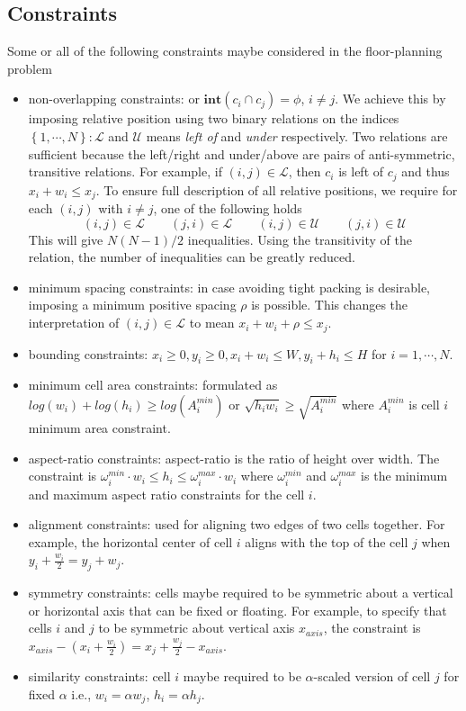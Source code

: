\documentclass[12pt] {article}
\begin{document}
\subsection*{Constraints}
Some or all of the following constraints maybe considered in the floor-planning problem
\begin{itemize}
\item non-overlapping constraints: or $\textbf{int}(c_{i}\cap c_{j})=\phi$, $i \neq j $. We achieve this by imposing relative position using two binary relations on the indices $\left\lbrace 1,\cdots, N \right\rbrace : \mathscr{L}$ and  $\mathscr{U}$ means \emph{left of} and \emph{under} respectively. Two relations are sufficient because the left/right and under/above are pairs of anti-symmetric, transitive relations. For example, if $(i,j)\in \mathscr{L}$, then $c_{i}$ is left of $c_{j}$ and thus $x_{i}+w_{i}\leq x_{j}$. To ensure full description of all relative positions, we require for each $(i,j)$ with $i\neq j$, one of the following holds 
$$(i,j)\in \mathscr{L} \qquad (j,i)\in \mathscr{L} \qquad (i,j)\in \mathscr{U} \qquad (j,i)\in \mathscr{U} $$
This will give $N(N-1)/2$ inequalities. Using the transitivity of the relation, the number of inequalities can be greatly reduced.

\item minimum spacing constraints: in case avoiding tight packing is desirable, imposing a minimum positive spacing $\rho$ is possible. This changes the interpretation of $(i,j)\in \mathscr{L}$ to mean $x_{i}+w_{i}+\rho \leq x_{j}$. 
\item bounding constraints: $x_{i}\geq0, y_{i}\geq0, x_{i}+w_{i}\leq W, y_{i}+h_{i}\leq H$ for $i=1,\cdots, N$. 
\item minimum cell area constraints: formulated as $log(w_{i})+log(h_{i}) \geq log(A_{i}^{min})$ or $\sqrt{h_{i}w_{i}}\geq \sqrt{A_{i}^{min}}$ where $A_{i}^{min}$ is cell $i$ minimum area constraint. 
\item aspect-ratio constraints: aspect-ratio is the ratio of height over width. The constraint is $\omega_{i}^{min}\cdot w_{i}\leq h_{i} \leq \omega_{i}^{max}\cdot w_{i}$ where $\omega_{i}^{min}$ and $\omega_{i}^{max}$ is the minimum and maximum aspect ratio constraints for the cell $i$.
\item alignment constraints: used for aligning two edges of two cells together. For example, the horizontal center of cell $i$ aligns with the top of the cell $j$ when $y_{i}+\frac{w_{i}}{2}=y_{j}+w_{j}$.
\item symmetry constraints: cells maybe required to be symmetric about a vertical or horizontal axis that can be  fixed or floating. For example, to specify that cells $i$ and $j$ to be symmetric about vertical axis $x_{axis}$, the constraint is $x_{axis}-(x_{i}+\frac{w_{i}}{2}) = x_{j}+\frac{w_{j}}{2}-x_{axis}$.
\item similarity constraints: cell $i$ maybe required to be $\alpha$-scaled version of cell $j$ for fixed $\alpha$ i.e., $w_{i}=\alpha w_{j}$, $h_{i}=\alpha h_{j}$. 


\end{itemize}
\end{document}
